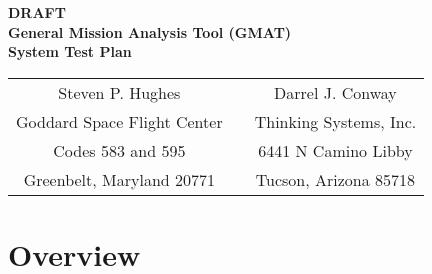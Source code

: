 \documentclass[10 pt]{book}
\begin{document}
\newcommand\chapauthor[1]{\emph{#1}}


\thispagestyle{empty}
\begin{center}
{\renewcommand{\thefootnote}{\fnsymbol{footnote}} { \huge \bf DRAFT
\\General Mission Analysis Tool (GMAT)\\System Test Plan\\}
\vspace{0.1in} }
\end{center}

\begin{figure}[H]
\begin{center}
\end{center}
\end{figure}

\begin{center}
\begin{tabular}{c c c}
  Steven P. Hughes & & Darrel J. Conway \\
  Goddard Space Flight Center & & Thinking Systems, Inc. \\
  Codes 583 and 595 & \hspace{0.3in} & 6441 N Camino Libby \\
  Greenbelt, Maryland 20771 & & Tucson, Arizona 85718 \\
\end{tabular}

\vspace{0.1in}{\today}

\end{center}

\clearpage \clearpage

\thispagestyle{empty}

\tableofcontents
\clearpage
\listoffigures
\clearpage
\listoftables

\part{Overview}
\thispagestyle{empty}
\end{document}
